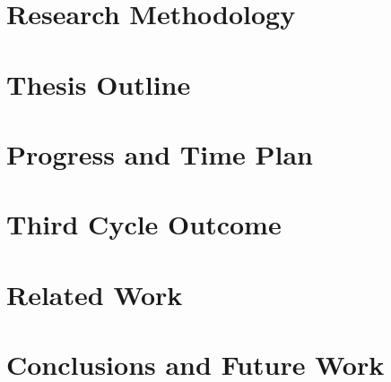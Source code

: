\documentclass{NSF}
\begin{document}
\section{Research Methodology}
\label{section:methods}


\section{Thesis Outline}
\label{section:outline}


\section{Progress and Time Plan}
\label{section:progress}


\section{Third Cycle Outcome}
\label{section:thirdcycle}



\section{Related Work}
\label{section:related}


\section{Conclusions and Future Work}
\label{section:conclusions}




\end{document}
